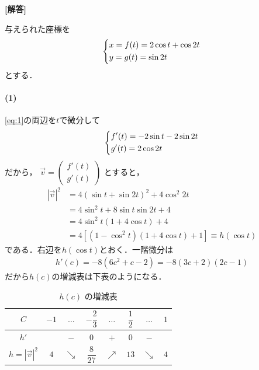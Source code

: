 \documentclass[../../main.tex]{subfiles}
\begin{document}
\begin{oframed}
  
\end{oframed}

{\bf [解答]}

与えられた座標を
\begin{align}
  \begin{dcases}
    x = f(t) = 2\cos t + \cos 2t \\
    y = g(t) = \sin 2t
  \end{dcases} \label{eq:1}
\end{align}
とする．

\paragraph{(1)}

\cref{eq:1}の両辺を$t$で微分して
\begin{align}
  \begin{dcases}
    f'(t) = -2\sin t - 2\sin 2t \\
    g'(t) = 2\cos 2t
  \end{dcases} \label{eq:2}
\end{align}
だから，
$\vec{v} =
\begin{pmatrix} f'(t) \\ g'(t)
\end{pmatrix}$
とすると，
\begin{align}
  |\vec{v}|^2
  &= 4(\sin t + \sin 2t)^2 + 4\cos^2 2t \\
  &= 4\sin^2 t + 8\sin t \sin 2t + 4 \\
  &= 4\sin^2 t(1 + 4\cos t) + 4 \\
  &= 4[(1-\cos^2t)(1+4\cos t) + 1] \equiv h(\cos t)
\end{align}
である．右辺を$h(\cos t)$とおく．一階微分は
\begin{align}
  h'(c)
  = -8(6c^2 + c - 2)
  = -8(3c+2)(2c-1)
\end{align}
だから$h(c)$の増減表は下表のようになる．

\begin{table}[htb]
  \centering
  \caption{$h(c)$ の増減表}
  \begin{tabular}{c|ccccccc}
    $C$  & $-1$ & $\dots$ & $-\dfrac{2}{3}$ & $\dots$ & $\dfrac{1}{2}$ & $\dots$ & $1$ \\ \hline
    $h'$ & & $-$ & $0$ & $+$ & $0$ & $-$ & \\ \hline
    $h=|\vec{v}|^2$  & $4$ & $\searrow$ & $\dfrac{8}{27}$ & $\nearrow$ & $13$ & $\searrow$ & $4$
  \end{tabular}
\end{table}
\end{document}
